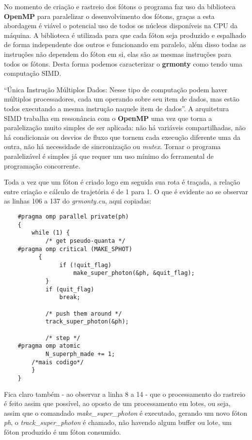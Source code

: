   No momento de criação e rastreio dos fótons o programa faz uso da biblioteca \textbf{OpenMP} para paralelizar o desenvolvimento dos fótons, graças a esta abordagem é viável o potencial uso de todos os núcleos disponíveis na CPU da máquina. A biblioteca é utilizada para que cada fóton seja produzido e espalhado de forma independente dos outros e funcionando em paralelo, além disso todas as instruções não dependem do fóton em si, elas são as mesmas instruções para todos os fótons. Desta forma podemos caracterizar o \textbf{grmonty} como tendo uma computação SIMD.

  ``Única Instrução Múltiplos Dados: Nesse tipo de computação podem haver múltiplos processadores, cada um operando sobre seu item de dados, mas estão todos executando a mesma instrução naquele item de dados''\citep[p.84, traduzido]{HCP:16}. A arquitetura SIMD trabalha em ressonância com o \textbf{OpenMP} uma vez que torna a paralelização muito simples de ser aplicada: não há variáveis compartilhadas, não há condicionais ou desvios de fluxo que tornem cada execução diferente uma da outra, não há necessidade de sincronização ou \textit{mutex}. Tornar o programa paralelizável é simples já que requer um uso mínimo do ferramental de programação concorrente.


  Toda a vez que um fóton é criado logo em seguida sua rota é traçada, a relação entre criação e cálculo de trajetória é de 1 para 1. O que é evidente ao se observar as linhas 106 a 137 do \textit{grmonty.cu}, aqui copiadas:

  \label{sec:main_loop}
  \begin{lstlisting}
    #pragma omp parallel private(ph)
  	{
  		while (1) {
  			/* get pseudo-quanta */
    #pragma omp critical (MAKE_SPHOT)
  		  {
  				if (!quit_flag)
  					make_super_photon(&ph, &quit_flag);
  			}
  			if (quit_flag)
  				break;

  			/* push them around */
  			track_super_photon(&ph);

  			/* step */
    #pragma omp atomic
  			N_superph_made += 1;
        /*mais codigo*/
  		}
  	}
  \end{lstlisting}

  Fica claro também - ao observar a linha 8 a 14 - que o processamento do rastreio é feito assim que possível, ao oposto de um processamento em lotes, ou seja, assim que o comandado \textit{make\_super\_photon} é executado, gerando um novo fóton \textit{ph}, o  \textit{track\_super\_photon} é chamado, não havendo algum buffer ou lote, um fóton produzido é um fóton consumido.

